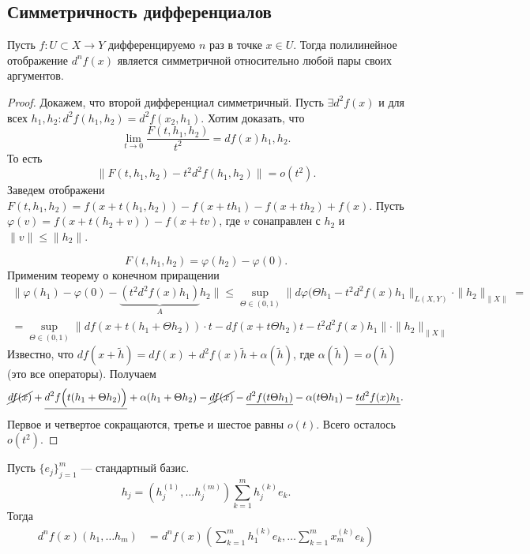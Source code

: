 \documentclass[11pt,dvipsnames]{report}
\begin{document}
\subsection{Симметричность дифференциалов}
\begin{thm}
    Пусть $ f\colon U \subset X \to  Y$ дифференцируемо $ n$ раз  в точке  $ x \in U$. Тогда полилинейное отображение $ d^{n}f(x)$ является симметричной относительно любой пары своих аргументов.
\end{thm}
\begin{proof}
    Докажем, что второй дифференциал симметричный.  Пусть $ \exists d^{2}f(x)$ и для всех $ h_1, h_2\colon d^2f(h_1, h_2) = d^2f(x_2, h_1)$.  
    Хотим доказать, что
    \[
	\lim_{t \to  0}\frac{F(t, h_1, h_2 )}{t^2} = df(x) h_1,h_2
    .\] 
    То есть
    \[
	\| F(t, h_1, h_2) - t^2 d^2f(h_1,h_2) \| = o(t^2) 
    .\] 
    Заведем отображени $ F(t, h_1, h_2) = f(x + t(h_1, h_2)) - f(x +th_1) - f(x + th_2) + f(x)$.
    Пусть $ \varphi (v) = f(x+ t(h_2 + v)) - f(x+tv)$, где $ v$ сонаправлен с  $ h_2$ и $ \| v \| \le  \| h_2 \| $.

    \[
	F(t, h_1, h_2) = \varphi (h_2) - \varphi (0)
    .\] 
Применим теорему о конечном приращении
\begin{align*}
    \|  \varphi (h_1) - \varphi (0) - \underbrace{(t^2 d^2f(x)h_1)}_{A}h_2 \| \le \sup_{\Theta \in (0, 1)}  \| d \varphi (\Theta h_1 - t^2 d^2f(x)h_1 \|_{L(X, Y)}  \cdot \| h_2 \|_{\| X \| }  = \\
    = \sup_{\Theta \in (0, 1)} \| df(x + t(h_1 + \Theta h_2)) \cdot  t  - df(x + t \Theta h_2)t -t^2d^2f(x)h_1\| \cdot \| h_2 \| _{\| X \| }  
\end{align*}
Известно, что $ df(x + \tilde h) = df(x) + d^2f(x) \tilde h + \alpha (\tilde h)$, где $ \alpha (\tilde h) = o(\tilde h)$ (это все операторы).
Получаем
\[
    \cancel {df(x)} + \underline{d^2f \Bigl(t (h_1 + \Theta h_2)\Bigr)} + \alpha (h_1+ \Theta h_2) - \cancel{df(x)} - \underline{d^2f(t \Theta h_1)} - \alpha (t\Theta h_1) - \underline{td^2f(x)h_1}
.\] 
Первое и четвертое сокращаются, третье и шестое равны $ o(t)$.
Всего осталось  $ o(t^2)$.
\end{proof}
\begin{thm}[частный случай, $ X = \R^{m} ~\R^{n}$]
    Пусть $ \{e_j\}_{j=1}^{m}$ --- стандартный базис.
    \[
	h_j = \left( h_j^{(1)}, \ldots h_j^{(m)} \right)  \sum_{k=1}^{m} h_{j}^{(k)} e_k 
    .\] 
    Тогда
    \begin{align*}
	d^{n}f(x) (h_1, \ldots h_m) & = d^{n}f(x) \left( \sum_{k=1}^{m} h_1^{(k)} e_k, \ldots \sum_{k=1}^{m} x_m^{(k)}e_k \right) 
    \end{align*}
\end{thm}
\end{document}
